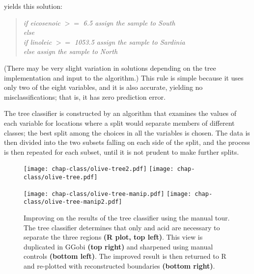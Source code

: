 \noindent yields this solution:

\begin{quote}
\begin{tabbing}
\= {\em if eicosenoic} $>=$ {\em 6.5  assign the sample to South}\\
\> {\em else}\\
\> \hspace{0.2in} \= {\em if linoleic} $>=$ {\em 1053.5  assign the sample to Sardinia}\\
\>  \>  {\em else                   assign the sample to North}
\end{tabbing}
\end{quote}

\noindent (There may be very slight variation in solutions depending
on the tree implementation and input to the algorithm.)  This rule is
simple because it uses only two of the eight variables, and it is also
accurate, yielding no misclassifications; that is, it has zero
prediction error.

The tree classifier is constructed by an algorithm that examines
the values of each variable for locations where a split would separate
members of different classes; the best split among the choices in all
the variables is chosen.  The data is then divided into the two
subsets falling on each side of the split, and the process is then
repeated for each subset, until it is not prudent to make further splits.

\begin{figure*}[htbp]
\centerline{
  {\texttt{[image: chap-class/olive-tree2.pdf]}}
  {\texttt{[image: chap-class/olive-tree.pdf]}}}
\smallskip
\centerline{
  {\texttt{[image: chap-class/olive-tree-manip.pdf]}}
  {\texttt{[image: chap-class/olive-tree-manip2.pdf]}}}
\caption[Improving on the results of the tree classifier using the
manual tour]{Improving on the results of the tree classifier using
the manual tour.  The tree classifier determines that only
 and  acid are necessary to separate the
three regions {\bf (R plot, top left)}.  This view is duplicated in
GGobi {\bf (top right)} and sharpened using manual controls {\bf
(bottom left)}.  The improved result is then returned to R and
re-plotted with reconstructed boundaries {\bf (bottom right)}.
}
\label{olive-tree}
\end{figure*}

